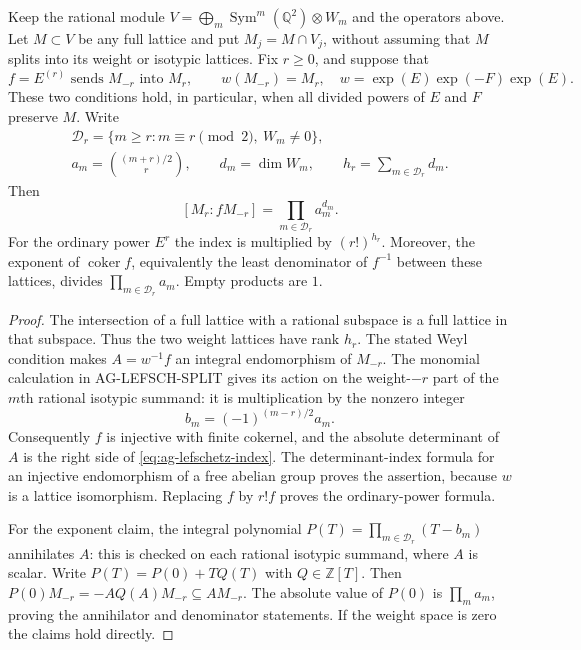 \begin{proposition}
Keep the rational module $V=\bigoplus_m\operatorname{Sym}^m
(\mathbb Q^2)\otimes W_m$ and the operators above. Let
$M\subset V$ be any full lattice and put $M_j=M\cap V_j$,
without assuming that $M$ splits into its weight or isotypic
lattices. Fix $r\ge0$, and suppose that
\[
 f=E^{(r)}\text{ sends }M_{-r}\text{ into }M_r,
 \qquad w(M_{-r})=M_r,
 \quad w=\exp(E)\exp(-F)\exp(E).
\]
These two conditions hold, in particular, when all divided
powers of $E$ and $F$ preserve $M$.
Write
\[
 \begin{gathered}
 \mathcal D_r=\{m\ge r:m\equiv r\pmod2,\ W_m\ne0\},\\
 a_m=\binom{(m+r)/2}{r},\qquad d_m=\dim W_m,
 \qquad h_r=\sum_{m\in\mathcal D_r}d_m.
 \end{gathered}
\]
Then
\begin{equation}\label{eq:ag-lefschetz-index}
 [M_r:fM_{-r}]=\prod_{m\in\mathcal D_r}a_m^{d_m}.
\end{equation}
For the ordinary power $E^r$ the index is multiplied by
$(r!)^{h_r}$. Moreover, the exponent of $\operatorname{coker}f$,
equivalently the least denominator of $f^{-1}$ between these
lattices, divides $\prod_{m\in\mathcal D_r}a_m$.
Empty products are $1$.
\end{proposition}
\begin{proof}
The intersection of a full lattice with a rational subspace
is a full lattice in that subspace. Thus the two weight lattices
have rank $h_r$. The stated Weyl condition makes
$A=w^{-1}f$ an integral endomorphism of $M_{-r}$.
The monomial calculation in AG-LEFSCH-SPLIT gives its action on
the weight-$-r$ part of the $m$th rational isotypic summand:
it is multiplication by the nonzero integer
\[
 b_m=(-1)^{(m-r)/2}a_m.
\]
Consequently $f$ is injective with finite cokernel, and the
absolute determinant of $A$ is the right side of
\eqref{eq:ag-lefschetz-index}. The determinant-index formula
for an injective endomorphism of a free abelian group proves
the assertion, because $w$ is a lattice isomorphism.
Replacing $f$ by $r!f$ proves the ordinary-power formula.

For the exponent claim, the integral polynomial
$P(T)=\prod_{m\in\mathcal D_r}(T-b_m)$ annihilates $A$:
this is checked on each rational isotypic summand, where $A$
is scalar. Write $P(T)=P(0)+TQ(T)$ with $Q\in\mathbb Z[T]$.
Then
$P(0)M_{-r}=-A Q(A)M_{-r}\subseteq A M_{-r}$.
The absolute value of $P(0)$ is $\prod_m a_m$, proving the
annihilator and denominator statements. If the weight space
is zero the claims hold directly.
\end{proof}

